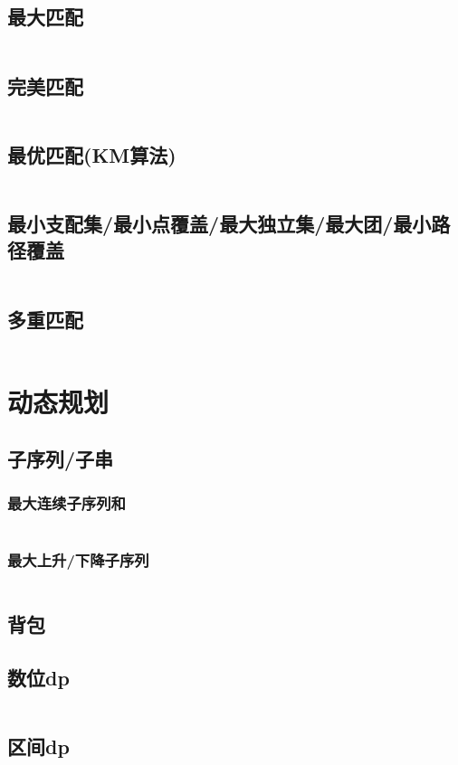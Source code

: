\documentclass[a4paper,9pt]{article}
\begin{document}
\subsection{最大匹配}
\inputminted[]{c++}{Template/NetworkFlow/MaximumMatch.cpp}
\subsection{完美匹配}
\inputminted[]{c++}{Template/NetworkFlow/PerfectMatch.cpp}
\subsection{最优匹配(KM算法)}
\inputminted[]{c++}{Template/NetworkFlow/KM.cpp}
\subsection{最小支配集/最小点覆盖/最大独立集/最大团/最小路径覆盖}
\inputminted[]{c++}{Template/NetworkFlow/SetPro.cpp}
\subsection{多重匹配}
\inputminted[]{c++}{Template/NetworkFlow/MultiMatch.cpp}
\section{动态规划}
\subsection{子序列/子串}
\subsubsection{最大连续子序列和}
\inputminted[]{c++}{Template/DynamicProgramming/MaxSubSum.cpp}
\subsubsection{最大上升/下降子序列}
\inputminted[]{c++}{Template/DynamicProgramming/LIS.cpp}
\subsection{背包}
\subsection{数位dp}
\inputminted[]{c++}{Template/DynamicProgramming/Digital-dp.cpp}
\subsection{区间dp}
\end{document}
